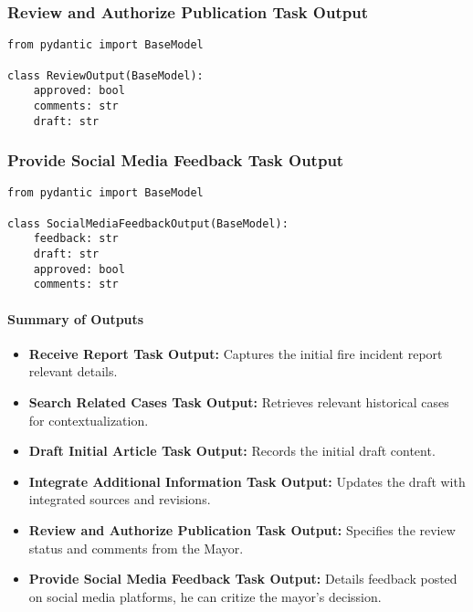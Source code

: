 \subsubsection{Review and Authorize Publication Task Output}
\begin{lstlisting}[caption={Pydantic model for Review and Authorize Publication Task Output}]
from pydantic import BaseModel

class ReviewOutput(BaseModel):
    approved: bool
    comments: str
    draft: str
\end{lstlisting}

\subsubsection{Provide Social Media Feedback Task Output}
\begin{lstlisting}[caption={Pydantic model for Provide Social Media Feedback Task Output}]
from pydantic import BaseModel

class SocialMediaFeedbackOutput(BaseModel):
    feedback: str
    draft: str
    approved: bool
    comments: str
\end{lstlisting}

\paragraph{Summary of Outputs}
\begin{itemize}
    \item \textbf{Receive Report Task Output:} Captures the initial fire incident report relevant details.
    \item \textbf{Search Related Cases Task Output:} Retrieves relevant historical cases for contextualization.
    \item \textbf{Draft Initial Article Task Output:} Records the initial draft content.
    \item \textbf{Integrate Additional Information Task Output:} Updates the draft with integrated sources and revisions.
    \item \textbf{Review and Authorize Publication Task Output:} Specifies the review status and comments from the Mayor.
    \item \textbf{Provide Social Media Feedback Task Output:} Details feedback posted on social media platforms, he can critize the mayor's decission.
\end{itemize}

